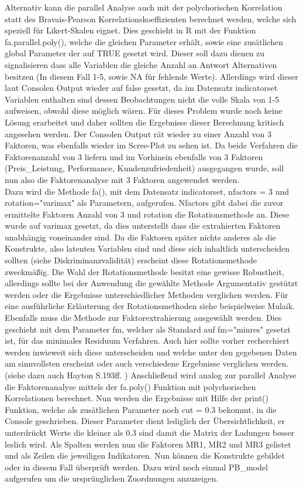\documentclass{article}\usepackage[]{graphicx}\usepackage[]{color}
\begin{document}
Alternativ kann die parallel Analyse auch mit der polychorischen Korrelation statt des Bravais-Pearson Korrelationskoeffizienten berechnet werden, welche sich speziell für Likert-Skalen eignet.\cite{joreskog1986prelis} Dies geschieht in R mit der Funktion fa.parallel.poly(), welche die gleichen Parameter erhält, sowie eine zusätlichen global Parameter der auf TRUE gesetzt wird. Dieser soll dazu dienen zu signalisieren dass alle Variablen die gleiche Anzahl an Antwort Alternativen besitzen (In diesem Fall 1-5, sowie NA für fehlende Werte). Allerdings wird dieser laut Consolen Output wieder auf false gesetzt, da im Datensatz indicatorset Variablen enthalten sind dessen Beobachtungen nicht die volle Skala von 1-5 aufweisen, obwohl diese möglich wären. Für dieses Problem wurde noch keine Lösung erarbeitet und daher sollten die Ergebnisse dieser Berechnung kritisch angesehen werden. Der Consolen Output rät wieder zu einer Anzahl von 3 Faktoren, was ebenfalls wieder im Scree-Plot zu sehen ist. Da beide Verfahren die Faktorenanzahl von 3 liefern und im Vorhinein ebenfalls von 3 Faktoren (Preis\_Leistung, Performance, Kundenzufriedenheit) ausgegangen wurde, soll nun also die Faktorenanalyse mit 3 Faktoren angewendet werden.\\
Dazu wird die Methode fa(), mit dem Datensatz indicatorset, nfactors = 3 und rotation="varimax" als Parametern, aufgerufen. Nfactors gibt dabei die zuvor ermittelte Faktoren Anzahl von 3 und rotation die Rotationsmethode an. Diese wurde auf varimax gesetzt, da dies unterstellt dass die extrahierten Faktoren unabhängig voneinander sind. Da die Faktoren später nichts anderes als die Konstrukte, also latenten Variablen sind und diese sich inhaltlich unterscheiden sollten (siehe Diskriminanzvalidität) erscheint diese Rotationsmethode zweckmäßig. Die Wahl der Rotationsmethode besitzt eine gewisse Robustheit\cite{zwick1986comparison}, allerdings sollte bei der Anwendung die gewählte Methode Argumentativ gestützt werden oder die Ergebnisse unterschiedlicher Methoden verglichen werden. Für eine ausführliche Erläuterung der Rotationsmethoden siehe beispielweise Mulaik.\cite{mulaik1972foundations} Ebenfalls muss die Methode zur Faktorextrahierung ausgewählt werden. Dies geschieht mit dem Parameter fm, welcher als Standard auf fm="minres" gesetzt ist, für das minimales Residuum Verfahren. Auch hier sollte vorher recherchiert werden inwieweit sich diese unterscheiden und welche unter den gegebenen Daten am sinnvollsten erscheint oder auch verschiedene Ergebnisse verglichen werden. (siehe dazu auch Hayton S.193ff.\cite{hayton2004factor} ) Anschließend wird analog zur parallel Analyse die Faktorenanalyse mittels der fa.poly() Funktion mit polychorischen Korrelationen berechnet. Nun werden die Ergebnisse mit Hilfe der print() Funktion, welche als zusätlichen Parameter noch cut = 0.3 bekommt, in die Console geschrieben. Dieser Parameter dient lediglich der Übersichtlichkeit, er unterdrückt Werte die kleiner als 0.3 sind damit die Matrix der Ladungen besser leslich wird. Als Spalten werden nun die Faktoren MR1, MR2 und MR3 gelistet und als Zeilen die jeweiligen Indikatoren. Nun können die Konstrukte gebildet oder in diesem Fall überprüft werden. Dazu wird noch einmal PB\_model aufgerufen um die ursprünglichen Zuordnungen anzuzeigen.\\
\end{document}
